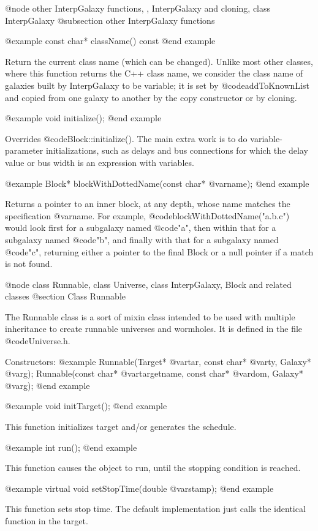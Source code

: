 @node other InterpGalaxy functions,  , InterpGalaxy and cloning, class InterpGalaxy
@subsection other InterpGalaxy functions

@example
const char* className() const
@end example

Return the current class name (which can be changed).  Unlike most
other classes, where this function returns the C++ class name, we
consider the class name of galaxies built by InterpGalaxy to be
variable; it is set by @code{addToKnownList} and copied from one
galaxy to another by the copy constructor or by cloning.

@example
void initialize();
@end example

Overrides @code{Block::initialize()}.  The main extra work is to do
variable-parameter initializations, such as delays and bus connections
for which the delay value or bus width is an expression with variables.

@example
Block* blockWithDottedName(const char* @var{name});
@end example

Returns a pointer to an inner block, at any depth, whose name matches
the specification @var{name}.  For example, @code{blockWithDottedName("a.b.c")}
would look first for a subgalaxy named @code{"a"}, then within that
for a subgalaxy named @code{"b"}, and finally with that for a subgalaxy
named @code{"c"}, returning either a pointer to the final Block or a
null pointer if a match is not found.

@node class Runnable, class Universe, class InterpGalaxy, Block and related classes
@section Class Runnable

The Runnable class is a sort of mixin class intended to be used with
multiple inheritance to create runnable universes and wormholes.  It
is defined in the file @code{Universe.h}.

Constructors:
@example
Runnable(Target* @var{tar}, const char* @var{ty}, Galaxy* @var{g});
Runnable(const char* @var{targetname}, const char* @var{dom}, Galaxy* @var{g});
@end example

@example
void initTarget();
@end example

This function initializes target and/or generates the schedule.

@example
int run();
@end example

This function causes the object to run, until the stopping condition is reached.

@example
virtual void setStopTime(double @var{stamp});
@end example

This function sets stop time.  The default implementation just
calls the identical function in the target.

